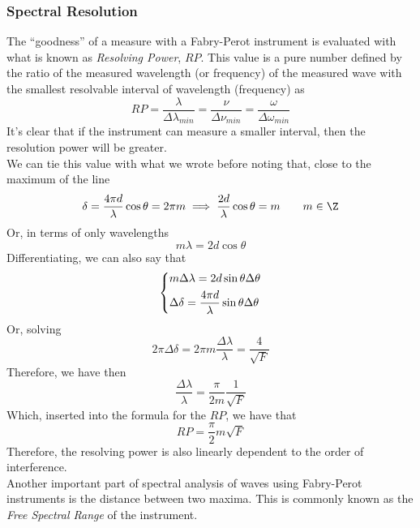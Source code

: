 \documentclass[../electromagnetism.tex]{subfiles}
\begin{document}
\subsubsection{Spectral Resolution}
The ``goodness'' of a measure with a Fabry-Perot instrument is evaluated with what is known as \textit{Resolving Power}, $RP$. This value is a pure number defined by the ratio of the measured wavelength (or frequency) of the measured wave with the smallest resolvable interval of wavelength (frequency) as
\begin{equation}
	RP=\frac{\lambda}{\Delta\lambda_{min}}=\frac{\nu}{\Delta\nu_{min}}=\frac{\omega}{\Delta\omega_{min}}
	\label{eq:rp.fpi}
\end{equation}
It's clear that if the instrument can measure a smaller interval, then the resolution power will be greater.\\
We can tie this value with what we wrote before noting that, close to the maximum of the line
\begin{equation*}
	\delta=\frac{4\pi d}{\lambda}\cos\theta=2\pi m\implies\frac{2d}{\lambda}\cos\theta=m\qquad m\in\Z
\end{equation*}
Or, in terms of only wavelengths 
\begin{equation*}
	m\lambda=2d\cos\theta
\end{equation*}
Differentiating, we can also say that
\begin{equation*}
	\begin{dcases}
		m\Delta\lambda=2d\sin\theta\Delta\theta\\
		\Delta\delta=\frac{4\pi d}{\lambda}\sin\theta\Delta\theta
	\end{dcases}
\end{equation*}
Or, solving
\begin{equation*}
	2\pi\Delta\delta=2\pi m\frac{\Delta\lambda}{\lambda}=\frac{4}{\sqrt{F}}
\end{equation*}
Therefore, we have then
\begin{equation}
	\frac{\Delta\lambda}{\lambda}=\frac{\pi}{2m}\frac{1}{\sqrt{F}}
	\label{eq:deltalonl.fpi}
\end{equation}
Which, inserted into the formula for the $RP$, we have that
\begin{equation}
	RP=\frac{\pi}{2}m\sqrt{F}
	\label{eq:rp2.fpi}
\end{equation}
Therefore, the resolving power is also linearly dependent to the order of interference.\\
Another important part of spectral analysis of waves using Fabry-Perot instruments is the distance between two maxima. This is commonly known as the \textit{Free Spectral Range} of the instrument.\\
\end{document}
